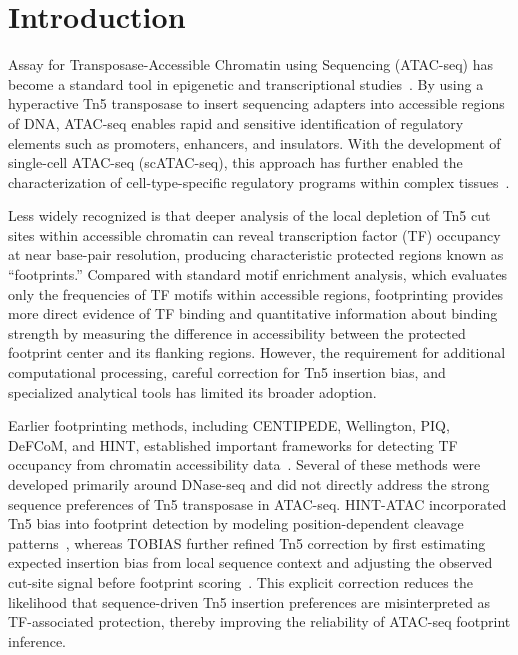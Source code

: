 \documentclass[biomedinformatics,article,submit,pdftex,moreauthors]{Definitions/mdpi}
\begin{document}
\section{Introduction}

Assay for Transposase-Accessible Chromatin using Sequencing (ATAC-seq) has
become a standard tool in epigenetic and transcriptional studies~\cite{buenrostro2013}.
By using a hyperactive Tn5 transposase to insert sequencing adapters into
accessible regions of DNA, ATAC-seq enables rapid and sensitive identification
of regulatory elements such as promoters, enhancers, and insulators. With the
development of single-cell ATAC-seq (scATAC-seq), this approach has further
enabled the characterization of cell-type-specific regulatory programs within
complex tissues~\cite{buenrostro2015scatac}.

Less widely recognized is that deeper analysis of the local depletion of Tn5 cut
sites within accessible chromatin can reveal transcription factor (TF) occupancy
at near base-pair resolution, producing characteristic protected regions known as
``footprints.'' Compared with standard motif enrichment analysis, which evaluates
only the frequencies of TF motifs within accessible regions, footprinting
provides more direct evidence of TF binding and quantitative information about
binding strength by measuring the difference in accessibility between the
protected footprint center and its flanking regions. However, the requirement for
additional computational processing, careful correction for Tn5 insertion bias,
and specialized analytical tools has limited its broader adoption.

Earlier footprinting methods, including CENTIPEDE, Wellington, PIQ, DeFCoM, and
HINT, established important frameworks for detecting TF occupancy from chromatin
accessibility data~\cite{pique2011centipede,piper2013wellington,sherwood2014piq,quach2017defcom,li2019hint}.
Several of these methods were developed primarily around DNase-seq and did not
directly address the strong sequence preferences of Tn5 transposase in ATAC-seq.
HINT-ATAC incorporated Tn5 bias into footprint detection by modeling
position-dependent cleavage patterns~\cite{li2019hint}, whereas TOBIAS further
refined Tn5 correction by first estimating expected insertion bias from local
sequence context and adjusting the observed cut-site signal before footprint
scoring~\cite{bentsen2020}. This explicit correction reduces the likelihood that
sequence-driven Tn5 insertion preferences are misinterpreted as TF-associated
protection, thereby improving the reliability of ATAC-seq footprint inference.
\end{document}
